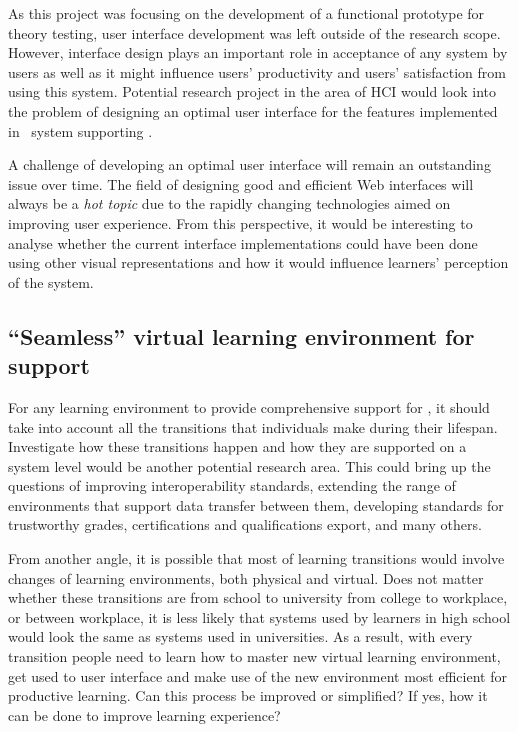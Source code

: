 As this project was focusing on the development of a functional prototype for
theory testing, user interface development was left outside of the research
scope. However, interface design plays an important role in acceptance of any
system by users as well as it might influence users' productivity and users'
satisfaction from using this system. Potential research project in the area of
HCI would look into the problem of designing an optimal user interface for the
features implemented in \ep~system supporting \LLLsn. 

A challenge of developing an optimal user interface will remain an outstanding
issue over time. The field of designing good and efficient Web interfaces will
always be a \textit{hot topic} due to the rapidly changing technologies aimed on
improving user experience. From this perspective, it would be interesting to
analyse whether the current interface implementations could have been done using
other visual representations and how it would influence learners' perception of
the system.

\subsection{``Seamless'' virtual learning environment for \LLLs support} 
For any learning environment to provide comprehensive support for \LLLs, it
should take into account all the transitions that individuals make during their
lifespan. Investigate how these transitions happen and how they are supported on
a system level would be another potential research area. This could bring up the
questions of improving interoperability standards, extending the range of
environments that support data transfer between them, developing standards for
trustworthy grades, certifications and qualifications export, and many others.

From another angle, it is possible that most of learning transitions would
involve changes of learning environments, both physical and virtual. Does not
matter whether these transitions are from school to university from college to
workplace, or between workplace, it is less likely that systems used by learners
in high school would look the same as systems used in universities. As a result,
with every transition people need to learn how to master new virtual learning
environment, get used to user interface and make use of the new environment most
efficient for productive learning. Can this process be improved or simplified?
If yes, how it can be done to improve learning experience?

